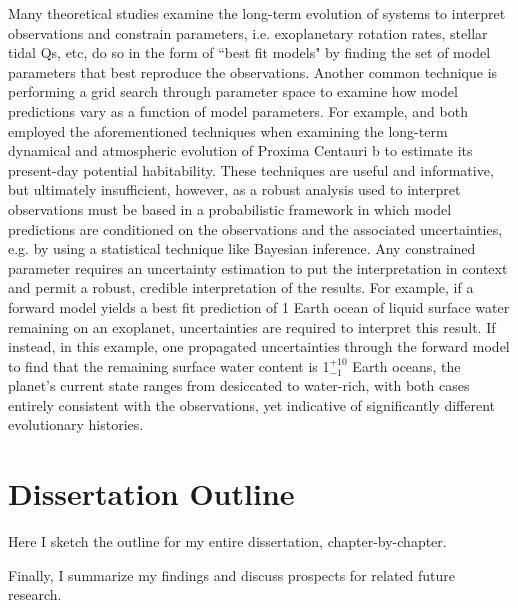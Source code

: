 Many theoretical studies examine the long-term evolution of systems to interpret observations and constrain parameters, i.e. exoplanetary rotation rates, stellar tidal Qs, etc, do so in the form of ``best fit models" by finding the set of model parameters that best reproduce the observations.  Another common technique is performing a grid search through parameter space to examine how model predictions vary as a function of model parameters.  For example, \citet{Ribas2016} and \citet{Barnes2016} both employed the aforementioned techniques when examining the long-term dynamical and atmospheric evolution of Proxima Centauri b to estimate its present-day potential habitability.  These techniques are useful and informative, but ultimately insufficient, however, as a robust analysis used to interpret observations must be based in a probabilistic framework in which model predictions are conditioned on the observations and the associated uncertainties, e.g. by using a statistical technique like Bayesian inference.  Any constrained parameter requires an uncertainty estimation to put the interpretation in context and permit a robust, credible interpretation of the results.  For example, if a forward model yields a best fit prediction of 1 Earth ocean of liquid surface water remaining on an exoplanet, uncertainties are required to interpret this result.  If instead, in this example, one propagated uncertainties through the forward model to find that the remaining surface water content is 1$^{+10}_{-1}$ Earth oceans, the planet's current state ranges from desiccated to water-rich, with both cases entirely consistent with the observations, yet indicative of significantly different evolutionary histories.  

\section{Dissertation Outline}

Here I sketch the outline for my entire dissertation, chapter-by-chapter.

Finally, I summarize my findings and discuss prospects for related future research.

